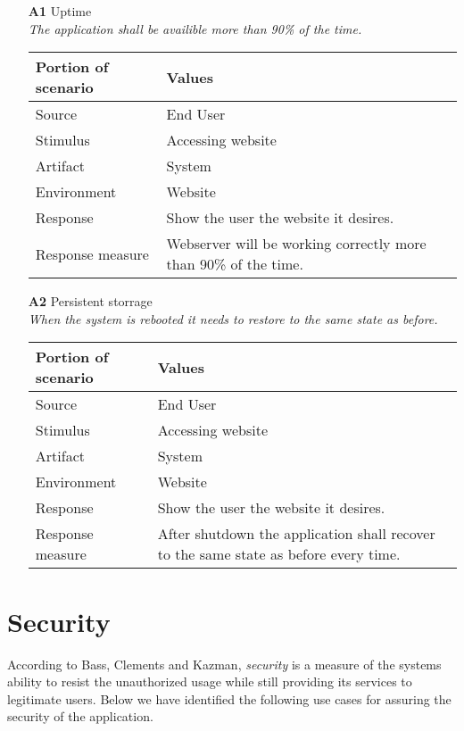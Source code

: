 \begin{itemize}
    \item[\textbf{A1}] Uptime \\
    \textit{\small{The application shall be availible more than 90\% of the time.}}
        
    \begin{tabular}{| l | p{7cm} |}
        \hline
        \rowcolor[gray]{0.8}
        \textbf{Portion of scenario} & \textbf{Values} \\
        \hline
        Source & End User \\
        Stimulus & Accessing website \\
        Artifact & System \\
        Environment & Website \\
        Response & Show the user the website it desires. \\
        Response measure & Webserver will be working correctly more than 90\% of the time. \\
        \hline
    \end{tabular}

    \item[\textbf{A2}] Persistent storrage \\
    \textit{\small{When the system is rebooted it needs to restore to the same state as before.}}
        
    \begin{tabular}{| l | p{7cm} |}
        \hline
        \rowcolor[gray]{0.8}
        \textbf{Portion of scenario} & \textbf{Values} \\
        \hline
        Source & End User \\
        Stimulus & Accessing website \\
        Artifact & System \\
        Environment & Website \\
        Response & Show the user the website it desires. \\
        Response measure & After shutdown the application shall recover to the same state as before every time. \\
        \hline
    \end{tabular}
\end{itemize}

\section{Security}
According to Bass, Clements and Kazman, \emph{security} is a measure of the systems ability to resist the unauthorized usage while still providing its services to legitimate users\cite{ProgarkPensum}. Below we have identified the following use cases for assuring the security of the application.

